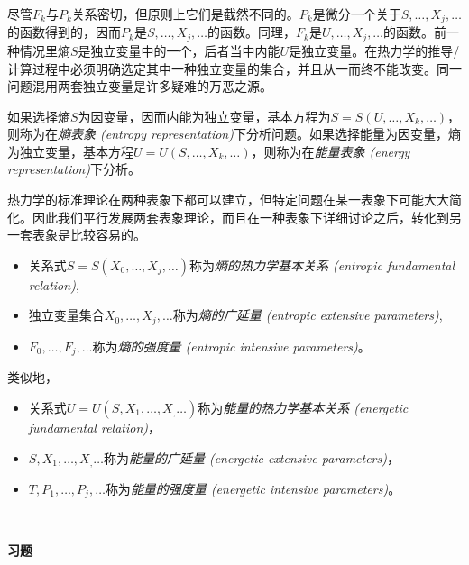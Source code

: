 尽管$F_k$与$P_k$关系密切，但原则上它们是截然不同的。$P_k$是微分一个关于$S, \dots, X_j, \dots$的函数得到的，因而$P_k$是$S, \dots, X_j, \dots$的函数。同理，$F_k$是$U, \dots, X_j, \dots$的函数。前一种情况里熵$S$是独立变量中的一个，后者当中内能$U$是独立变量。在热力学的推导/计算过程中必须明确选定其中一种独立变量的集合，并且从一而终不能改变。同一问题混用两套独立变量是许多疑难的万恶之源。

如果选择熵$S$为因变量，因而内能为独立变量，基本方程为$S = S(U, \dots, X_k, \dots)$，则称为在{\it 熵表象 (entropy representation)}下分析问题。如果选择能量为因变量，熵为独立变量，基本方程$U = U(S, \dots, X_k, \dots)$，则称为在{\it 能量表象 (energy representation)}下分析。

热力学的标准理论在两种表象下都可以建立，但特定问题在某一表象下可能大大简化。因此我们平行发展两套表象理论，而且在一种表象下详细讨论之后，转化到另一套表象是比较容易的。

\begin{itemize}
\item 关系式$S = S(X_0, \dots, X_j, \dots)$称为{\it 熵的热力学基本关系 (entropic fundamental relation)},
\item 独立变量集合$X_0, \dots, X_j, \dots$称为{\it 熵的广延量 (entropic extensive parameters)},
\item $F_0, \dots, F_j, \dots$称为{\it 熵的强度量 (entropic intensive parameters)}。
\end{itemize}

类似地，

\begin{itemize}
\item 关系式$U = U(S, X_1, \dots, X_, \dots)$称为{\it 能量的热力学基本关系 (energetic fundamental relation)}， 
\item $S, X_1, \dots, X_, \dots$称为{\it 能量的广延量 (energetic extensive parameters)}，
\item $T, P_1, \dots, P_j, \dots$称为{\it 能量的强度量 (energetic intensive  parameters)}。
\end{itemize}

\ 

{\large \bf 习题}

\ 

